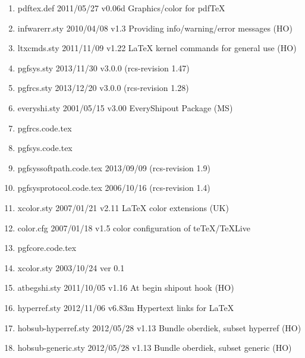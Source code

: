 \begin{enumerate}
\item pdftex.def 2011/05/27 v0.06d Graphics/color for pdfTeX
\item infwarerr.sty 2010/04/08 v1.3 Providing info/warning/error messages (HO)
\item ltxcmds.sty 2011/11/09 v1.22 LaTeX kernel commands for general use (HO)
\item pgfsys.sty 2013/11/30 v3.0.0 (rcs-revision 1.47)
\item pgfrcs.sty 2013/12/20 v3.0.0 (rcs-revision 1.28)
\item everyshi.sty 2001/05/15 v3.00 EveryShipout Package (MS)
\item pgfrcs.code.tex
\item pgfsys.code.tex
\item pgfsyssoftpath.code.tex 2013/09/09 (rcs-revision 1.9)
\item pgfsysprotocol.code.tex 2006/10/16 (rcs-revision 1.4)
\item xcolor.sty 2007/01/21 v2.11 LaTeX color extensions (UK)
\item color.cfg 2007/01/18 v1.5 color configuration of teTeX/TeXLive
\item pgfcore.code.tex
\item 	xcolor.sty 2003/10/24 ver 0.1
\item atbegshi.sty 2011/10/05 v1.16 At begin shipout hook (HO)
\item hyperref.sty 2012/11/06 v6.83m Hypertext links for LaTeX
\item hobsub-hyperref.sty 2012/05/28 v1.13 Bundle oberdiek, subset hyperref (HO)
\item hobsub-generic.sty 2012/05/28 v1.13 Bundle oberdiek, subset generic (HO)

\end{enumerate}
